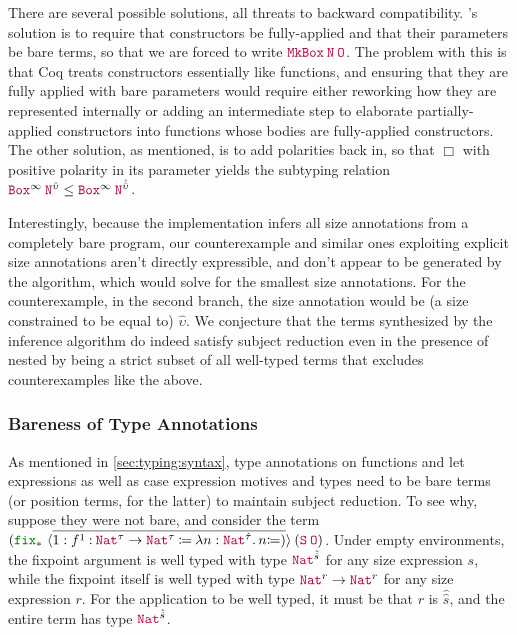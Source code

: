 There are several possible solutions, all threats to backward compatibility.
\CIChat's solution is to require that constructors be fully-applied and that their parameters be bare terms,
so that we are forced to write $\app{\MkBox}{\nat}{\Zero}$.
The problem with this is that Coq treats constructors essentially like functions,
and ensuring that they are fully applied with bare parameters would require either reworking how they are represented internally
or adding an intermediate step to elaborate partially-applied constructors into functions whose bodies are fully-applied constructors.
The other solution, as mentioned, is to add polarities back in, so that $\Box$ with positive polarity in its parameter yields the subtyping relation $\app{\Box^\infty}{\nat^{\hat{\upsilon}}} \leq \app{\Box^\infty}{\nat^{\hat{\hat{\upsilon}}}}$.

Interestingly, because the implementation infers all size annotations from a completely bare program,
our counterexample and similar ones exploiting explicit size annotations aren't directly expressible,
and don't appear to be generated by the algorithm, which would solve for the smallest size annotations.
For the counterexample, in the second branch, the size annotation would be (a size constrained to be equal to) $\hat{\upsilon}$.
We conjecture that the terms synthesized by the inference algorithm do indeed satisfy subject reduction even in the presence of nested \coinductives
by being a strict subset of all well-typed terms that excludes counterexamples like the above.

\subsubsection{Bareness of Type Annotations}\label{sec:metatheory:sr:bare}

As mentioned in \autoref{sec:typing:syntax}, type annotations on functions and let expressions
as well as case expression motives and \cofixpoint types
need to be bare terms (or position terms, for the latter) to maintain subject reduction.
To see why, suppose they were not bare, and consider the term
$\app{(\fix*{1}{\defn{f^1}{\Nat^\tau \rightarrow \Nat^\tau}{\abs{n}{\Nat^{\hat{\tau}}}{n}}})}{(\app{\Succ}{\Zero})}$.
Under empty environments, the fixpoint argument is well typed with type $\Nat^{\hat{\hat{s}}}$ for any size expression $s$,
while the fixpoint itself is well typed with type $\Nat^{r} \rightarrow \Nat^{r}$ for any size expression $r$.
For the application to be well typed, it must be that $r$ is $\hat{\hat{s}}$,
and the entire term has type $\Nat^{\hat{\hat{s}}}$.

